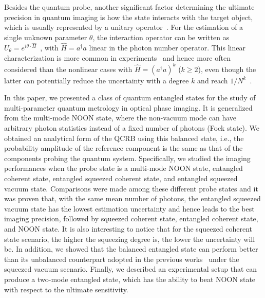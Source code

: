\documentclass[aps,pra,reprint,showpacs,groupedaddress]{revtex4-1}
\begin{document}
Besides the quantum probe, another significant factor determining the ultimate precision in quantum imaging is how the state interacts with the target object, which is usually represented by a unitary operator~\cite{Liu2015_unitary_QFI_H_mixed_lnl}. For the estimation of a single unknown parameter $\theta$, the interaction operator can be written as $U_\theta=e^{i\theta \cdot \hat{H}}$~\cite{Joo2011_singe_ECS_l}, with $\hat{H}=a^\dagger a$ linear in the photon number operator. This linear characterization is more common in experiments~\cite{kacprowicz2010_experiments_single, giovannetti2011_experiments_single, krischek2011_experiments_single} and hence more often considered than the nonlinear cases with $\hat{H}=(a^\dagger a)^k$ ($k\geq 2$), even though the latter can potentially reduce the uncertainty with a degree $k$ and reach $1/N^{k}$~\cite{Joo2012_singe_ECS_nl}.

In this paper, we presented a class of quantum entangled states for the study of multi-parameter quantum metrology in optical phase imaging. It is generalized from the multi-mode NOON state, where the non-vacuum mode can have arbitrary photon statistics instead of a fixed number of photons (Fock state). We obtained an analytical form of the QCRB using this balanced state, i.e., the probability amplitude of the reference component is the same as that of the components probing the quantum system. Specifically, we studied the imaging performances when the probe state is a multi-mode NOON state, entangled coherent state, entangled squeezed coherent state, and entangled squeezed vacuum state.  Comparisons were made among these different probe states and it was proven that, with the same mean number of photons, the entangled squeezed vacuum state has the lowest estimation uncertainty and hence leads to the best imaging precision, followed by squeezed coherent state, entangled coherent state, and NOON state. It is also interesting to notice that for the squeezed coherent state scenario, the higher the squeezing degree is, the lower the uncertainty will be.  In addition, we showed that the balanced entangled state can perform better than its unbalanced counterpart adopted in the previous works~\cite{Liu2016_multi_GeneralizedECS_lnl, Humphreys2013_multi_NOON_l} under the squeezed vacuum scenario. Finally, we described an experimental setup that can produce a two-mode entangled state, which has the ability to beat NOON state with respect to the ultimate sensitivity.



\end{document}
